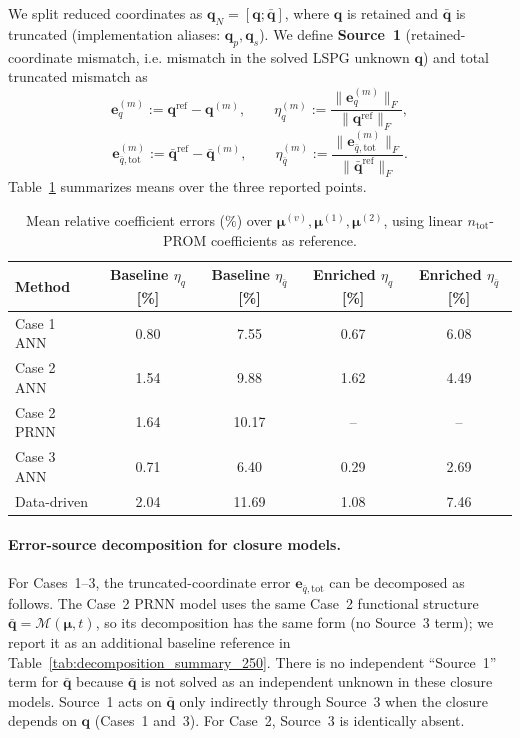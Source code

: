 \documentclass[11pt]{article}
\begin{document}
We split reduced coordinates as $\mathbf q_N=[\mathbf q;\bar{\mathbf q}]$, where $\mathbf q$ is retained and $\bar{\mathbf q}$ is truncated (implementation aliases: $\mathbf q_p,\mathbf q_s$). We define
\textbf{Source~1} (retained-coordinate mismatch, i.e. mismatch in the solved LSPG unknown $\mathbf q$) and total truncated mismatch as
\[
\mathbf e_q^{(m)}:=\mathbf q^{\mathrm{ref}}-\mathbf q^{(m)},
\qquad
\eta_q^{(m)}:=\frac{\|\mathbf e_q^{(m)}\|_F}{\|\mathbf q^{\mathrm{ref}}\|_F},
\]
\[
\mathbf e_{\bar q,\mathrm{tot}}^{(m)}:=\bar{\mathbf q}^{\mathrm{ref}}-\bar{\mathbf q}^{(m)},
\qquad
\eta_{\bar q}^{(m)}:=\frac{\|\mathbf e_{\bar q,\mathrm{tot}}^{(m)}\|_F}{\|\bar{\mathbf q}^{\mathrm{ref}}\|_F}.
\]
Table~\ref{tab:coeff_primary_secondary_summary} summarizes means over the three reported points.

\begin{table}[H]
\centering
\caption{Mean relative coefficient errors (\%) over $\bm\mu^{(v)},\bm\mu^{(1)},\bm\mu^{(2)}$, using linear $n_{\mathrm{tot}}$-PROM coefficients as reference.}
\label{tab:coeff_primary_secondary_summary}
\begin{tabular}{lcccc}
\hline
Method & Baseline $\eta_q$ [\%] & Baseline $\eta_{\bar q}$ [\%] & Enriched $\eta_q$ [\%] & Enriched $\eta_{\bar q}$ [\%] \\
\hline
Case 1 ANN & 0.80 & 7.55 & 0.67 & 6.08 \\
Case 2 ANN & 1.54 & 9.88 & 1.62 & 4.49 \\
Case 2 PRNN & 1.64 & 10.17 & -- & -- \\
Case 3 ANN & 0.71 & 6.40 & 0.29 & 2.69 \\
Data-driven & 2.04 & 11.69 & 1.08 & 7.46 \\
\hline
\end{tabular}
\end{table}

\paragraph{Error-source decomposition for closure models.}
For Cases~1--3, the truncated-coordinate error $\mathbf e_{\bar q,\mathrm{tot}}$ can be decomposed as follows. The Case~2 PRNN model uses the same Case~2 functional structure $\bar{\mathbf q}=\mathcal M(\bm\mu,t)$, so its decomposition has the same form (no Source~3 term); we report it as an additional baseline reference in Table~\ref{tab:decomposition_summary_250}.
There is no independent ``Source~1'' term for $\bar{\mathbf q}$ because $\bar{\mathbf q}$ is not solved as an independent unknown in these closure models. Source~1 acts on $\bar{\mathbf q}$ only indirectly through Source~3 when the closure depends on $\mathbf q$ (Cases~1 and~3). For Case~2, Source~3 is identically absent.
\end{document}
